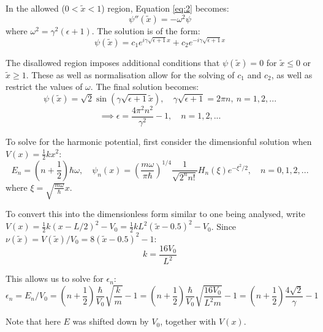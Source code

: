 \documentclass[11pt]{article}
\begin{document}
In the allowed ($0<\tilde{x}<1$) region, Equation \ref{eq:2} becomes:
\begin{equation}
  \psi''(\tilde{x})=-\omega^2 \psi
\end{equation}
where $\omega^2 = \gamma^2(\epsilon+1)$. The solution is of the form:
\begin{equation}
  \psi(\tilde{x})=c_1 e^{i \gamma \sqrt{\epsilon+1} x} +c_2 e^{-i \gamma \sqrt{\epsilon+1} x}
\end{equation}

The disallowed region imposes additional conditions that $\psi(\tilde{x})=0$
for $\tilde{x}\leq0$ or $\tilde{x}\geq1$. These as well as normalisation
allow for the solving of $c_1$ and
$c_2$, as well as restrict the values of $\omega$. The final solution becomes:
\begin{equation}
  \psi(\tilde{x})=\sqrt{2}\sin(\gamma \sqrt{\epsilon+1} \tilde{x}),\quad \gamma\sqrt{\epsilon+1}=2\pi n,\ n=1,2,...
\end{equation}
\begin{equation}
  \implies \epsilon=\frac{4\pi^2n^2}{\gamma^2}-1,\quad n=1,2,...
  \label{eq:epsilon}
\end{equation}

To solve for the harmonic potential, first consider the dimensionful solution when
$V(x)=\frac{1}{2}k x^2$\cite{grif}:
\begin{equation}
  E_n=(n+\frac{1}{2})\hbar \omega,
  \quad \psi_n(x)=\left(\frac{m\omega}{\pi \hbar}\right)^{1/4}\frac{1}{\sqrt{2^n n!}}H_n(\xi)e^{-\xi^2/2},
  \quad n=0,1,2,...
\end{equation}
where $\xi=\sqrt{\frac{m\omega}{\hbar}}x$. 

To convert this into the dimensionless form similar to one being analysed,
write $V(x)=\frac{1}{2}k(x-L/2)^2-V_0=\frac{1}{2}kL^2(\tilde{x}-0.5)^2-V_0$.
Since $\nu(\tilde{x})=V(\tilde{x})/V_0=8(\tilde{x}-0.5)^2-1$: 
\begin{equation}
  k=  \frac{16V_0}{L^2}
\end{equation}

This allows us to solve for $\epsilon_n$:
\begin{equation}
  \epsilon_n=E_n/V_0=(n+\frac{1}{2})\frac{\hbar}{V_0}\sqrt{\frac{k}{m}}-1=
  (n+\frac{1}{2})\frac{\hbar}{V_0}\sqrt{\frac{16V_0}{L^2m}}-1=
  (n+\frac{1}{2})\frac{4\sqrt{2}}{\gamma}-1
\end{equation}

Note that here $E$ was shifted down by $V_0$, together with $V(x)$.
\end{document}
